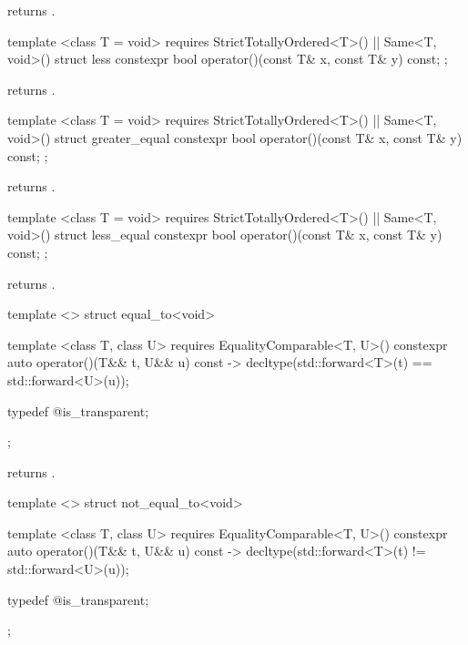 \begin{itemdescr}
\pnum
{} returns .
\end{itemdescr}

%
\begin{itemdecl}
template <class T = void>
  requires StrictTotallyOrdered<T>() || Same<T, void>()
struct less {
  constexpr bool operator()(const T& x, const T& y) const;
};
\end{itemdecl}

\begin{itemdescr}
\pnum
{} returns .
\end{itemdescr}

%
\begin{itemdecl}
template <class T = void>
  requires StrictTotallyOrdered<T>() || Same<T, void>()
struct greater_equal {
  constexpr bool operator()(const T& x, const T& y) const;
};
\end{itemdecl}

\begin{itemdescr}
\pnum
{} returns .
\end{itemdescr}

%
\begin{itemdecl}
template <class T = void>
  requires StrictTotallyOrdered<T>() || Same<T, void>()
struct less_equal {
  constexpr bool operator()(const T& x, const T& y) const;
};
\end{itemdecl}

\begin{itemdescr}
\pnum
{} returns .
\end{itemdescr}

%
\begin{itemdecl}
template <> struct equal_to<void> {
  template <class T, class U>
    requires EqualityComparable<T, U>()
  constexpr auto operator()(T&& t, U&& u) const
    -> decltype(std::forward<T>(t) == std::forward<U>(u));

  typedef @\unspec@ is_transparent;
};
\end{itemdecl}

\begin{itemdescr}
\pnum
{} returns .
\end{itemdescr}

%
\begin{itemdecl}
template <> struct not_equal_to<void> {
  template <class T, class U>
    requires EqualityComparable<T, U>()
  constexpr auto operator()(T&& t, U&& u) const
    -> decltype(std::forward<T>(t) != std::forward<U>(u));

  typedef @\unspec@ is_transparent;
};
\end{itemdecl}

